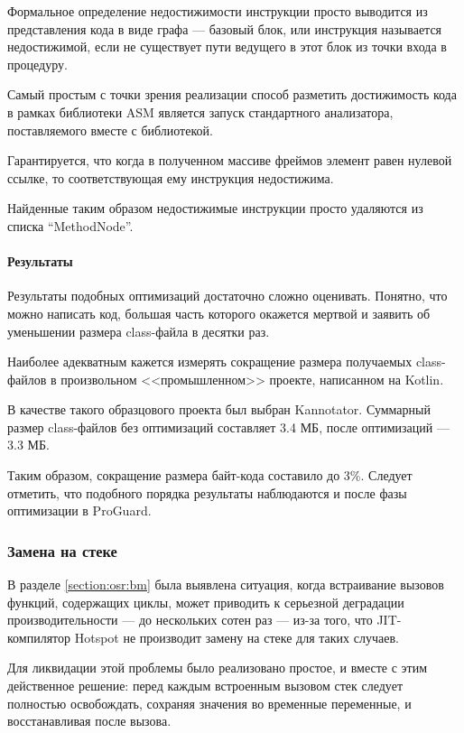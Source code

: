 Формальное определение недостижимости инструкции просто выводится из представления кода в виде
графа --- базовый блок, или инструкция называется недостижимой, если не существует пути
ведущего в этот блок из точки входа в процедуру.

Самый простым с точки зрения реализации способ разметить достижимость кода в рамках библиотеки ASM
является запуск стандартного анализатора, поставляемого вместе с библиотекой.

Гарантируется, что когда в полученном массиве фреймов элемент равен нулевой ссылке, то
соответствующая ему инструкция недостижима.

Найденные таким образом недостижимые инструкции просто удаляются из списка ``MethodNode''.

\paragraph{Результаты}
Результаты подобных оптимизаций достаточно сложно оценивать.
Понятно, что можно написать код, большая часть которого окажется мертвой и заявить об уменьшении
размера class-файла в десятки раз.

Наиболее адекватным кажется измерять сокращение размера получаемых class-файлов в произвольном
<<промышленном>> проекте, написанном на Kotlin.

В качестве такого образцового проекта был выбран Kannotator.
Суммарный размер class-файлов без оптимизаций составляет 3.4 МБ, после оптимизаций --- 3.3 МБ.

Таким образом, сокращение размера байт-кода составило до 3\%.
Следует отметить, что подобного порядка результаты наблюдаются и после фазы оптимизации
в ProGuard.

\subsubsection{Замена на стеке}
\label{section:osr:opt}
В разделе \ref{section:osr:bm} была выявлена ситуация, когда встраивание вызовов функций, содержащих
циклы, может приводить к серьезной деградации производительности --- до нескольких сотен раз ---
из-за того, что JIT-компилятор Hotspot не производит замену на стеке для таких случаев.

Для ликвидации этой проблемы было реализовано простое, и вместе с этим действенное решение:
перед каждым встроенным вызовом стек следует полностью освобождать, сохраняя значения во временные
переменные, и восстанавливая после вызова.

